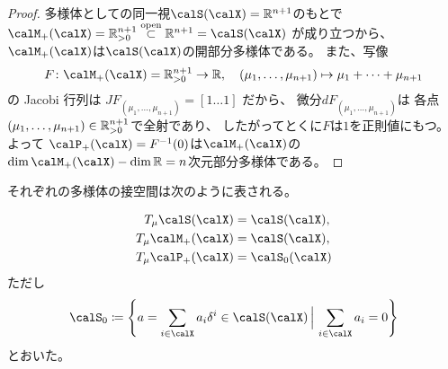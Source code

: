 \documentclass[report]{jlreq}
\begin{document}
\begin{proof}
    多様体としての同一視$\calS(\calX) = \R^{n + 1}$のもとで
    $\calM_+(\calX) = \R_{> 0}^{n + 1} \opensubset \R^{n + 1} = \calS(\calX)$
    が成り立つから、
    $\calM_+(\calX)$は$\calS(\calX)$の開部分多様体である。
    また、\smooth 写像
    \begin{equation}
        F \colon \calM_+(\calX) = \R_{> 0}^{n + 1} \to \R,
            \quad
            (\mu_1, \dots, \mu_{n + 1}) \mapsto \mu_1 + \dots + \mu_{n + 1}
    \end{equation}
    の Jacobi 行列は
    $JF_{(\mu_1, \dots, \mu_{n + 1})} = [1 \dots 1]$
    だから、
    微分$dF_{(\mu_1, \dots, \mu_{n + 1})}$は
    各点$(\mu_1, \dots, \mu_{n + 1}) \in \mathbb{R}_{> 0}^{n + 1}$で全射であり、
    したがってとくに$F$は$1$を正則値にもつ。
    よって
    $\calP_+(\calX) = F^{-1}(0)$は$\calM_+(\calX)$の
    $\dim \calM_+(\calX) - \dim \R = n$次元部分多様体である。
\end{proof}

それぞれの多様体の接空間は次のように表される。

\begin{proposition}
    \begin{alignat}{1}
        T_{\mu} \calS(\calX)
            &= \calS(\calX), \\
        T_{\mu} \calM_+(\calX)
            &= \calS(\calX), \\
        T_{\mu} \calP_+(\calX)
            &= \calS_0(\calX)
    \end{alignat}
    ただし
    \begin{equation}
        \calS_0
            \coloneqq \mybrace{
                a = \sum_{i \in \calX} a_i \delta^i \in \calS(\calX)
                \,\Big|\,
                \sum_{i \in \calX} a_i = 0
            }
    \end{equation}
    とおいた。
\end{proposition}
\end{document}
